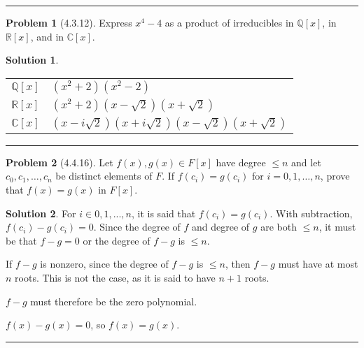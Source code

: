 \documentclass[12pt]{article}
\theoremstyle{definition}
\newtheorem*{prob}{Problem}
\newtheorem*{soln}{Solution}
\newcommand{\hr}{\vspace*{\parskip}\hrule}
\newcommand{\CC}{{\mathbb{C}}}
\newcommand{\ZZ}{{\mathbb{Z}}}
\newcommand{\RR}{{\mathbb{R}}}
\newcommand{\QQ}{{\mathbb{Q}}}
\begin{document}
\hr

\begin{prob}[4.3.12]
Express $x^4 - 4$ as a product of irreducibles in $\QQ[x]$, in $\RR[x]$, and in $\CC[x]$.
\end{prob}

\begin{soln}
\quad

\begin{tabular}{l l}
$\QQ[x]$ & $(x^2+2)(x^2-2)$\\
$\RR[x]$ & $(x^2+2)(x-\sqrt2)(x+\sqrt2)$\\
$\CC[x]$ & $(x-i\sqrt2)(x+i\sqrt2)(x-\sqrt2)(x+\sqrt2)$\\
\end{tabular}

\end{soln}


%
%
%

%
%
\hr

\begin{prob}[4.4.16]
Let $f(x), g(x) \in F[x]$ have degree $\leq n$ and let 
$c_0, c_1, \dots, c_n$ be distinct elements of  $F$. If  $f(c_i) = g(c_i)$ for 
$i = 0, 1, \dots, n$, prove that $f(x) = g(x)$ in $F[x]$.
\end{prob}

\begin{soln}

For $i\in0,1,...,n$, it is said that $f(c_i)=g(c_i)$.
With subtraction, $f(c_i)-g(c_i)=0$.
Since the degree of $f$ and degree of $g$ are both $\leq n$,
it must be that $f-g=0$ or the degree of $f-g$ is $\leq n$.

If $f-g$ is nonzero,
since the degree of $f-g$ is $\leq n$,
then $f-g$ must have at most $n$ roots.
This is not the case, as it is said to have $n+1$ roots.

$f-g$ must therefore be the zero polynomial.

$f(x)-g(x)=0$, so $f(x)=g(x)$.

\end{soln}
\hr
\end{document}
